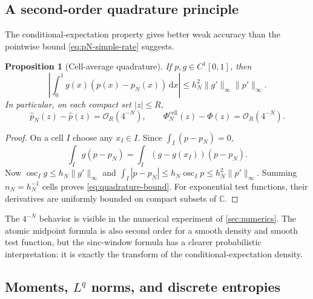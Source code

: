 \documentclass[11pt,oneside]{article}
\newtheorem{proposition}[theorem]{Proposition}
\theoremstyle{definition}
\theoremstyle{remark}
\newcommand{\C}{\mathbb C}
\newcommand{\dd}{\,\mathrm d}
\newcommand{\bigO}{\mathcal O}
\DeclareMathOperator{\osc}{osc}
\begin{document}
\subsection{A second-order quadrature principle}

The conditional-expectation property gives better weak accuracy than the
pointwise bound \eqref{eq:pN-simple-rate} suggests.

\begin{proposition}[Cell-average quadrature]
\label{prop:cell-quadrature}
If $p,g\in C^1[0,1]$, then
\begin{equation}\label{eq:quadrature-bound}
 \left|\int_0^1g(x)(p(x)-p_N(x))\dd x\right|
 \le h_N^2\|g'\|_\infty\|p'\|_\infty.
\end{equation}
In particular, on each compact set $|z|\le R$,
\begin{equation}\label{eq:transform-O4N}
 \widehat p_N(z)-\widehat p(z)=\bigO_R(4^{-N}),
 \qquad
 \Phi_N^{\mathrm{cell}}(z)-\Phi(z)=\bigO_R(4^{-N}).
\end{equation}
\end{proposition}

\begin{proof}
On a cell $I$ choose any $x_I\in I$.  Since
$\int_I(p-p_N)=0$,
\[
 \int_Ig(p-p_N)=\int_I(g-g(x_I))(p-p_N).
\]
Now $\osc_Ig\le h_N\|g'\|_\infty$ and
$\int_I|p-p_N|\le h_N\osc_Ip\le h_N^2\|p'\|_\infty$.
Summing $n_N=h_N^{-1}$ cells proves \eqref{eq:quadrature-bound}.
For exponential test functions, their derivatives are uniformly bounded on
compact subsets of $\C$.
\end{proof}

The $4^{-N}$ behavior is visible in the numerical experiment of
\cref{sec:numerics}.  The atomic midpoint formula is also second order for a
smooth density and smooth test function, but the sinc-window formula has a
clearer probabilistic interpretation: it is exactly the transform of the
conditional-expectation density.

\subsection{Moments, $L^q$ norms, and discrete entropies}
\end{document}
